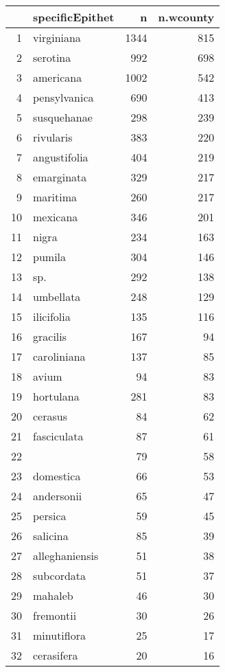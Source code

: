\documentclass{article}\usepackage[]{graphicx}\usepackage[]{color}
\begin{document}
\begin{table}[ht]
\centering
\begin{tabular}{rlrr}
  \hline
 & specificEpithet & n & n.wcounty \\ 
  \hline
1 & virginiana & 1344 & 815 \\ 
  2 & serotina & 992 & 698 \\ 
  3 & americana & 1002 & 542 \\ 
  4 & pensylvanica & 690 & 413 \\ 
  5 & susquehanae & 298 & 239 \\ 
  6 & rivularis & 383 & 220 \\ 
  7 & angustifolia & 404 & 219 \\ 
  8 & emarginata & 329 & 217 \\ 
  9 & maritima & 260 & 217 \\ 
  10 & mexicana & 346 & 201 \\ 
  11 & nigra & 234 & 163 \\ 
  12 & pumila & 304 & 146 \\ 
  13 & sp. & 292 & 138 \\ 
  14 & umbellata & 248 & 129 \\ 
  15 & ilicifolia & 135 & 116 \\ 
  16 & gracilis & 167 &  94 \\ 
  17 & caroliniana & 137 &  85 \\ 
  18 & avium &  94 &  83 \\ 
  19 & hortulana & 281 &  83 \\ 
  20 & cerasus &  84 &  62 \\ 
  21 & fasciculata &  87 &  61 \\ 
  22 &  &  79 &  58 \\ 
  23 & domestica &  66 &  53 \\ 
  24 & andersonii &  65 &  47 \\ 
  25 & persica &  59 &  45 \\ 
  26 & salicina &  85 &  39 \\ 
  27 & alleghaniensis &  51 &  38 \\ 
  28 & subcordata &  51 &  37 \\ 
  29 & mahaleb &  46 &  30 \\ 
  30 & fremontii &  30 &  26 \\ 
  31 & minutiflora &  25 &  17 \\ 
  32 & cerasifera &  20 &  16 \\ 

\end{tabular}
\end{table}
\end{document}
